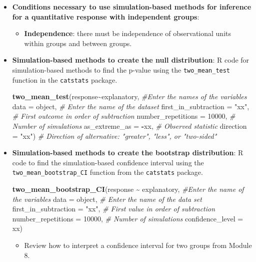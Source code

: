 \documentclass[
]{report}
\newenvironment{Shaded}{\begin{snugshade}}{\end{snugshade}}
\newcommand{\AttributeTok}[1]{\textcolor[rgb]{0.13,0.29,0.53}{#1}}
\newcommand{\CommentTok}[1]{\textcolor[rgb]{0.56,0.35,0.01}{\textit{#1}}}
\newcommand{\DecValTok}[1]{\textcolor[rgb]{0.00,0.00,0.81}{#1}}
\newcommand{\FunctionTok}[1]{\textcolor[rgb]{0.13,0.29,0.53}{\textbf{#1}}}
\newcommand{\NormalTok}[1]{#1}
\newcommand{\SpecialCharTok}[1]{\textcolor[rgb]{0.81,0.36,0.00}{\textbf{#1}}}
\newcommand{\StringTok}[1]{\textcolor[rgb]{0.31,0.60,0.02}{#1}}
\providecommand{\tightlist}{%
  \setlength{\itemsep}{0pt}\setlength{\parskip}{0pt}}
\begin{document}
\begin{itemize}
\item
  \textbf{Conditions necessary to use simulation-based methods for inference for a quantitative response with independent groups}:

  \begin{itemize}
  \tightlist
  \item
    \textbf{Independence}: there must be independence of observational units within groups and between groups.
  \end{itemize}
\item
  \textbf{Simulation-based methods to create the null distribution}: R code for simulation-based methods to find the p-value using the \texttt{two\_mean\_test} function in the \texttt{catstats} package.

\begin{Shaded}
\begin{Highlighting}[]
\FunctionTok{two\_mean\_test}\NormalTok{(response}\SpecialCharTok{\textasciitilde{}}\NormalTok{explanatory, }\CommentTok{\#Enter the names of the variables }
           \AttributeTok{data =}\NormalTok{ object,  }\CommentTok{\# Enter the name of the dataset}
          \AttributeTok{first\_in\_subtraction =} \StringTok{"xx"}\NormalTok{, }\CommentTok{\# First outcome in order of subtraction }
           \AttributeTok{number\_repetitions =} \DecValTok{10000}\NormalTok{,  }\CommentTok{\# Number of simulations }
           \AttributeTok{as\_extreme\_as =} \SpecialCharTok{{-}}\NormalTok{xx,  }\CommentTok{\# Observed statistic }
           \AttributeTok{direction =} \StringTok{"xx"}\NormalTok{)  }\CommentTok{\# Direction of alternative: "greater", "less", or "two{-}sided"}
\end{Highlighting}
\end{Shaded}
\item
  \textbf{Simulation-based methods to create the bootstrap distribution}: R code to find the simulation-based confidence interval using the \texttt{two\_mean\_bootstrap\_CI} function from the \texttt{catstats} package.

\begin{Shaded}
\begin{Highlighting}[]
\FunctionTok{two\_mean\_bootstrap\_CI}\NormalTok{(response }\SpecialCharTok{\textasciitilde{}}\NormalTok{ explanatory, }\CommentTok{\#Enter the name of the variables}
                  \AttributeTok{data =}\NormalTok{ object,  }\CommentTok{\# Enter the name of the data set}
                  \AttributeTok{first\_in\_subtraction =} \StringTok{"xx"}\NormalTok{, }\CommentTok{\# First value in order of subtraction}
                  \AttributeTok{number\_repetitions =} \DecValTok{10000}\NormalTok{,  }\CommentTok{\# Number of simulations}
                  \AttributeTok{confidence\_level =}\NormalTok{ xx)}
\end{Highlighting}
\end{Shaded}

  \begin{itemize}
  \tightlist
  \item
    Review how to interpret a confidence interval for two groups from Module 8.
  \end{itemize}
\end{itemize}
\end{document}
